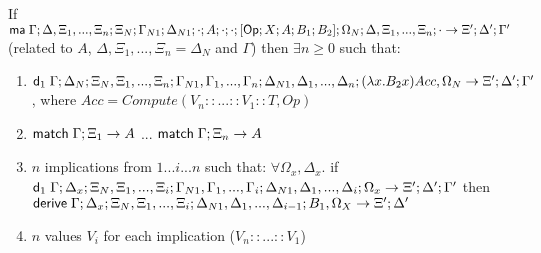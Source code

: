 \begin{lemma}
   If $\mathsf{ma} \; \Gamma; \Delta, \Xi_1, ..., \Xi_n; \Xi_N; \Gamma_{N1}; \Delta_{N1}; \cdot; A; \cdot; \cdot; [\mathsf{Op} ; X ; A ; B_1; B_2]; \Omega_N; \Delta, \Xi_1, ..., \Xi_n; \cdot \rightarrow \Xi'; \Delta'; \Gamma'$ (related to $A$, $\Delta, \Xi_1, ..., \Xi_n = \Delta_N$ and $\Gamma$) then $\exists n \geq 0$ such that:
   
   \begin{enumerate}
      \item $\mathsf{d}_1 \; \Gamma; \Delta_N; \Xi_N, \Xi_1, ..., \Xi_n; \Gamma_{N1}, \Gamma_1, ..., \Gamma_n; \Delta_{N1}, \Delta_1, ..., \Delta_n; (\lambda x. B_2 x)Acc, \Omega_N \rightarrow \Xi'; \Delta'; \Gamma'$, where $Acc = Compute(V_n :: ... :: V_1 :: T, Op)$
      \item $\mathsf{match} \; \Gamma; \Xi_1 \rightarrow A$ ... $\mathsf{match} \; \Gamma; \Xi_n \rightarrow A$
      \item $n$ implications from $1...i...n$ such that: $\forall \Omega_x, \Delta_x.$ if $\mathsf{d}_1 \; \Gamma; \Delta_x; \Xi_N, \Xi_1, ..., \Xi_i; \Gamma_{N1}, \Gamma_1, ..., \Gamma_i; \Delta_{N1}, \Delta_1, ..., \Delta_i; \Omega_x \rightarrow \Xi'; \Delta'; \Gamma'$ then \\ $\mathsf{derive} \; \Gamma; \Delta_x; \Xi_N, \Xi_1, ..., \Xi_i; \Delta_{N1}, \Delta_1, ..., \Delta_{i-1}; B_1, \Omega_X \rightarrow \Xi'; \Delta'$
      \item $n$ values $V_i$ for each implication ($V_n :: ... :: V_1$)
   \end{enumerate}
\end{lemma}

